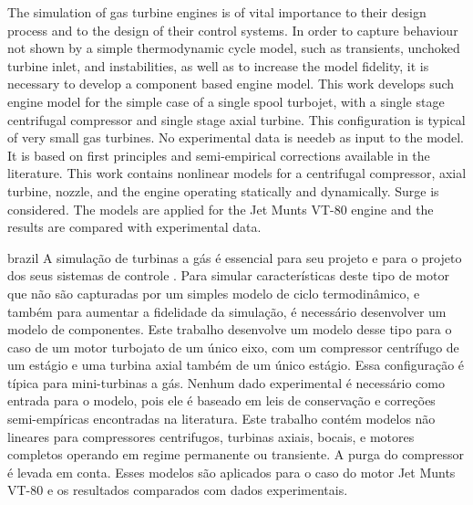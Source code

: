 
\setlength{\absparsep}{18pt} %
\begin{resumo}
    The simulation of gas turbine engines is of vital importance to their design process and to the design of their control systems.
    In order to capture behaviour not shown by a simple thermodynamic cycle model, such as transients, unchoked turbine inlet, and instabilities, 
    as well as to increase the model fidelity, it is necessary to develop a component based engine model. 
    This work develops such engine model  for the simple case of a single spool turbojet, 
    with a single stage centrifugal compressor and single stage axial turbine. This configuration is typical of very small gas turbines.
    No experimental data is needeb as input to the model. It is based on first principles and semi-empirical corrections available in the literature.
    This work contains nonlinear models for a centrifugal compressor, axial turbine, nozzle, and the engine operating statically and dynamically.
    Surge is considered. The models are applied for the Jet Munts VT-80 engine and the results are compared with experimental data.

\end{resumo}

\begin{resumo}[Resumo]
 \begin{otherlanguage*}{brazil}
     A simulação de turbinas a gás é essencial para seu projeto e para o projeto dos seus sistemas de controle .
     Para simular características deste tipo de motor que não são capturadas por um simples modelo de ciclo termodinâmico, 
     e também para aumentar a fidelidade da simulação, é necessário desenvolver um modelo de componentes.
     Este trabalho desenvolve um modelo desse tipo para o caso de um motor turbojato de um único eixo, 
     com um compressor centrífugo de um estágio e uma turbina axial também de um único estágio.
     Essa configuração é típica para mini-turbinas a gás.
     Nenhum dado experimental é necessário como entrada para o modelo, pois ele é baseado em leis de conservação e correções semi-empíricas encontradas na literatura.
     Este trabalho contém modelos não lineares para compressores centrifugos, turbinas axiais, bocais, e motores completos operando em regime permanente ou transiente.
     A purga do compressor é levada em conta. Esses modelos são aplicados para o caso do motor Jet Munts VT-80 e os resultados comparados com dados experimentais.
     
   \noindent 
 \end{otherlanguage*}
\end{resumo}

